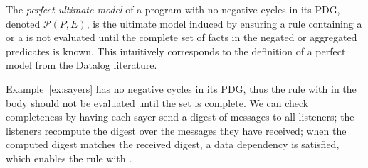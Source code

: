 \begin{definition}
The {\em perfect ultimate model} of a \lang program with no negative cycles in its PDG, denoted $\mathcal{P}(P, E)$, is the ultimate model induced by ensuring a rule containing a \dedalus{!} or a  is not evaluated until the complete set of facts in the negated or aggregated predicates is known.
This intuitively corresponds to the definition of a perfect model from the Datalog literature.
\end{definition}


Example~\ref{ex:sayers} has no negative cycles in its PDG, thus the rule with  in the body should not be evaluated until the  set is complete.  We can check completeness by having each sayer send a digest of  messages to all listeners; the listeners recompute the digest over the  messages they have received; when the computed digest matches the received digest, a data dependency is satisfied, which enables the rule with .


